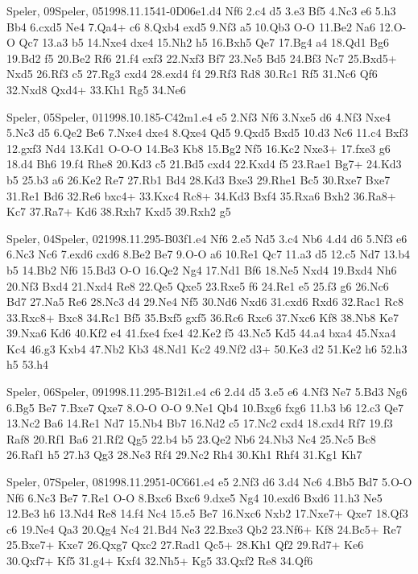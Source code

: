 \documentclass[twocolumn,a4paper,10pt]{report}
\begin{document}
\begin{chessgame}{Speler, 09}{Speler, 05}{1998.11.15}{4}{1-0}{D06e}{1.d4 Nf6 2.c4 d5 3.e3 Bf5 4.Nc3 e6 5.h3 Bb4 6.cxd5 Ne4 7.Qa4+ c6 8.Qxb4 exd5 9.Nf3 a5 10.Qb3 O-O 11.Be2 Na6 12.O-O Qc7 13.a3 b5 14.Nxe4 dxe4 15.Nh2 h5 16.Bxh5 Qe7 17.Bg4 a4 18.Qd1 Bg6 19.Bd2 f5 20.Be2 Rf6 21.f4 exf3 22.Nxf3 Bf7 23.Ne5 Bd5 24.Bf3 Nc7 25.Bxd5+ Nxd5 26.Rf3 c5 27.Rg3 cxd4 28.exd4 f4 29.Rf3 Rd8 30.Rc1 Rf5 31.Nc6 Qf6 32.Nxd8 Qxd4+ 33.Kh1 Rg5 34.Ne6}\end{chessgame}
\begin{chessgame}{Speler, 05}{Speler, 01}{1998.10.18}{5}{\textonehalf-\textonehalf}{C42m}{1.e4 e5 2.Nf3 Nf6 3.Nxe5 d6 4.Nf3 Nxe4 5.Nc3 d5 6.Qe2 Be6 7.Nxe4 dxe4 8.Qxe4 Qd5 9.Qxd5 Bxd5 10.d3 Nc6 11.c4 Bxf3 12.gxf3 Nd4 13.Kd1 O-O-O 14.Be3 Kb8 15.Bg2 Nf5 16.Kc2 Nxe3+ 17.fxe3 g6 18.d4 Bh6 19.f4 Rhe8 20.Kd3 c5 21.Bd5 cxd4 22.Kxd4 f5 23.Rae1 Bg7+ 24.Kd3 b5 25.b3 a6 26.Ke2 Re7 27.Rb1 Bd4 28.Kd3 Bxe3 29.Rhe1 Bc5 30.Rxe7 Bxe7 31.Re1 Bd6 32.Re6 bxc4+ 33.Kxc4 Rc8+ 34.Kd3 Bxf4 35.Rxa6 Bxh2 36.Ra8+ Kc7 37.Ra7+ Kd6 38.Rxh7 Kxd5 39.Rxh2 g5}\end{chessgame}
\begin{chessgame}{Speler, 04}{Speler, 02}{1998.11.29}{5}{\textonehalf-\textonehalf}{B03f}{1.e4 Nf6 2.e5 Nd5 3.c4 Nb6 4.d4 d6 5.Nf3 e6 6.Nc3 Nc6 7.exd6 cxd6 8.Be2 Be7 9.O-O a6 10.Re1 Qc7 11.a3 d5 12.c5 Nd7 13.b4 b5 14.Bb2 Nf6 15.Bd3 O-O 16.Qe2 Ng4 17.Nd1 Bf6 18.Ne5 Nxd4 19.Bxd4 Nh6 20.Nf3 Bxd4 21.Nxd4 Re8 22.Qe5 Qxe5 23.Rxe5 f6 24.Re1 e5 25.f3 g6 26.Nc6 Bd7 27.Na5 Re6 28.Nc3 d4 29.Ne4 Nf5 30.Nd6 Nxd6 31.cxd6 Rxd6 32.Rac1 Rc8 33.Rxc8+ Bxc8 34.Rc1 Bf5 35.Bxf5 gxf5 36.Rc6 Rxc6 37.Nxc6 Kf8 38.Nb8 Ke7 39.Nxa6 Kd6 40.Kf2 e4 41.fxe4 fxe4 42.Ke2 f5 43.Nc5 Kd5 44.a4 bxa4 45.Nxa4 Kc4 46.g3 Kxb4 47.Nb2 Kb3 48.Nd1 Kc2 49.Nf2 d3+ 50.Ke3 d2 51.Ke2 h6 52.h3 h5 53.h4}\end{chessgame}
\begin{chessgame}{Speler, 06}{Speler, 09}{1998.11.29}{5}{\textonehalf-\textonehalf}{B12i}{1.e4 c6 2.d4 d5 3.e5 e6 4.Nf3 Ne7 5.Bd3 Ng6 6.Bg5 Be7 7.Bxe7 Qxe7 8.O-O O-O 9.Ne1 Qb4 10.Bxg6 fxg6 11.b3 b6 12.c3 Qe7 13.Nc2 Ba6 14.Re1 Nd7 15.Nb4 Bb7 16.Nd2 c5 17.Nc2 cxd4 18.cxd4 Rf7 19.f3 Raf8 20.Rf1 Ba6 21.Rf2 Qg5 22.b4 b5 23.Qe2 Nb6 24.Nb3 Nc4 25.Nc5 Bc8 26.Raf1 h5 27.h3 Qg3 28.Ne3 Rf4 29.Nc2 Rh4 30.Kh1 Rhf4 31.Kg1 Kh7}\end{chessgame}
\begin{chessgame}{Speler, 07}{Speler, 08}{1998.11.29}{5}{1-0}{C66}{1.e4 e5 2.Nf3 d6 3.d4 Nc6 4.Bb5 Bd7 5.O-O Nf6 6.Nc3 Be7 7.Re1 O-O 8.Bxc6 Bxc6 9.dxe5 Ng4 10.exd6 Bxd6 11.h3 Ne5 12.Be3 h6 13.Nd4 Re8 14.f4 Nc4 15.e5 Be7 16.Nxc6 Nxb2 17.Nxe7+ Qxe7 18.Qf3 c6 19.Ne4 Qa3 20.Qg4 Nc4 21.Bd4 Ne3 22.Bxe3 Qb2 23.Nf6+ Kf8 24.Bc5+ Re7 25.Bxe7+ Kxe7 26.Qxg7 Qxc2 27.Rad1 Qc5+ 28.Kh1 Qf2 29.Rd7+ Ke6 30.Qxf7+ Kf5 31.g4+ Kxf4 32.Nh5+ Kg5 33.Qxf2 Re8 34.Qf6\mate}\end{chessgame}
\end{document}
